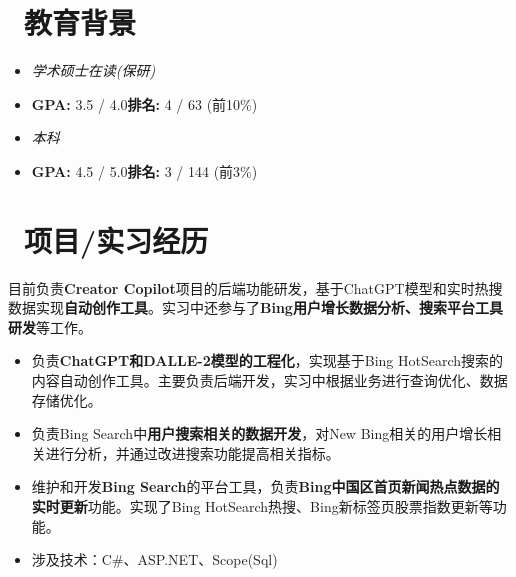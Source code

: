 \documentclass{resume}
\begin{document}


  \section{\faGraduationCap\ 教育背景}
  \begin{itemize}
    \item \textit{学术硕士在读(保研)}
    \item \textbf{GPA:} 3.5 / 4.0\space \space \textbf{排名:} 4 /  63 (前10\%)
  \end{itemize}
  \begin{itemize}
    \item \textit{本科}
    \item \textbf{GPA:} 4.5 / 5.0\space \space \textbf{排名:} 3 / 144 (前3\%)
  \end{itemize}

\section{\faUsers\ 项目/实习经历}

目前负责\textbf{Creator Copilot}项目的后端功能研发，基于ChatGPT模型和实时热搜数据实现\textbf{自动创作工具}。实习中还参与了\textbf{Bing用户增长数据分析、搜索平台工具研发}等工作。
\begin{itemize}
  \item 负责\textbf{ChatGPT和DALLE-2模型的工程化}，实现基于Bing HotSearch搜索的内容自动创作工具。主要负责后端开发，实习中根据业务进行查询优化、数据存储优化。
  \item 负责Bing Search中\textbf{用户搜索相关的数据开发}，对New Bing相关的用户增长相关进行分析，并通过改进搜索功能提高相关指标。
  \item 维护和开发\textbf{Bing Search}的平台工具，负责\textbf{Bing中国区首页新闻热点数据的实时更新}功能。实现了Bing HotSearch热搜、Bing新标签页股票指数更新等功能。
  \item 涉及技术：C\#、ASP.NET、Scope(Sql)
\end{itemize}
\end{document}
